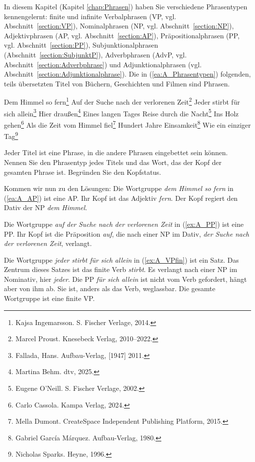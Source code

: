 In diesem Kapitel (Kapitel \ref{chap:Phrasen}) haben Sie verschiedene Phrasentypen kennengelernt: finite und infinite Verbalphrasen (VP, vgl. Abschnitt~\ref{section:VP}), Nominalphrasen (NP, vgl. Abschnitt~\ref{section:NP}), Adjektivphrasen (AP, vgl. Abschnitt~\ref{section:AP}), Präpositionalphrasen (PP, vgl. Abschnitt~\ref{section:PP}), Subjunktionalphrasen (Abschnitt~\ref{section:SubjunktP}), Adverbphrasen (AdvP, vgl. Abschnitt~\ref{section:Adverbphrase}) und Adjunktionalphrasen (vgl. Abschnitt~\ref{section:Adjunktionalphrase}). Die in (\ref{ea:A_Phrasentypen}) folgenden, teils übersetzten Titel von Büchern, Geschichten und Filmen sind Phrasen.   

\ea \label{ea:A_Phrasentypen}
\ea \label{ea:A_AP} Dem Himmel so fern\footnote{Kajsa Ingemarsson. S. Fischer Verlage, 2014.} 
\ex \label{ex:A_PP} Auf der Suche nach der verlorenen Zeit\footnote{Marcel Proust. Knesebeck Verlag, 2010--2022.} 
\ex \label{ex:A_VPfin} Jeder stirbt für sich allein\footnote{Fallada, Hans. Aufbau-Verlag, [1947] 2011.}
\ex \label{ex:A_AdvP} Hier draußen\footnote{Martina Behm. dtv, 2025.} 
\ex \label{ex:A_NP1} Eines langen Tages Reise durch die Nacht\footnote{Eugene O'Neill. S. Fischer Verlage, 2002.}
\ex \label{ex:A_VPinf} Ins Holz gehen\footnote{Carlo Cassola. Kampa Verlag, 2024.}
\ex \label{ex:A_SP} Als die Zeit vom Himmel fiel\footnote{Mella Dumont. CreateSpace Independent Publishing Platform, 2015.}
\ex \label{ex:A_NP2} Hundert Jahre Einsamkeit\footnote{Gabriel García Márquez. Aufbau-Verlag, 1980.}
\ex \label{ex:A_AdjunktionalP} Wie ein einziger Tag\footnote{Nicholas Sparks. Heyne, 1996.}
\z 
\z 

Jeder Titel ist eine Phrase, in die andere Phrasen eingebettet sein können. Nennen Sie den Phrasentyp jedes Titels und das Wort, das der Kopf der gesamten Phrase ist. Begründen Sie den Kopfstatus.



Kommen wir nun zu den Lösungen: Die Wortgruppe \textit{dem Himmel so fern} in (\ref{ea:A_AP}) ist eine AP. Ihr Kopf ist das Adjektiv \textit{fern}. Der Kopf regiert den Dativ der NP \textit{dem Himmel}. 

Die Wortgruppe \textit{auf der Suche nach der verlorenen Zeit} in (\ref{ex:A_PP}) ist eine PP. Ihr Kopf ist die Präposition \textit{auf}, die nach einer NP im Dativ, \textit{der Suche nach der verlorenen Zeit}, verlangt. 

Die Wortgruppe \textit{jeder stirbt für sich allein} in (\ref{ex:A_VPfin}) ist ein Satz. Das Zentrum dieses Satzes ist das finite Verb \textit{stirbt}. Es verlangt nach einer NP im Nominativ, hier \textit{jeder}. Die PP \textit{für sich allein} ist nicht vom Verb gefordert, hängt aber von ihm ab. Sie ist, anders als das Verb, weglassbar. Die gesamte Wortgruppe ist eine finite VP. 

